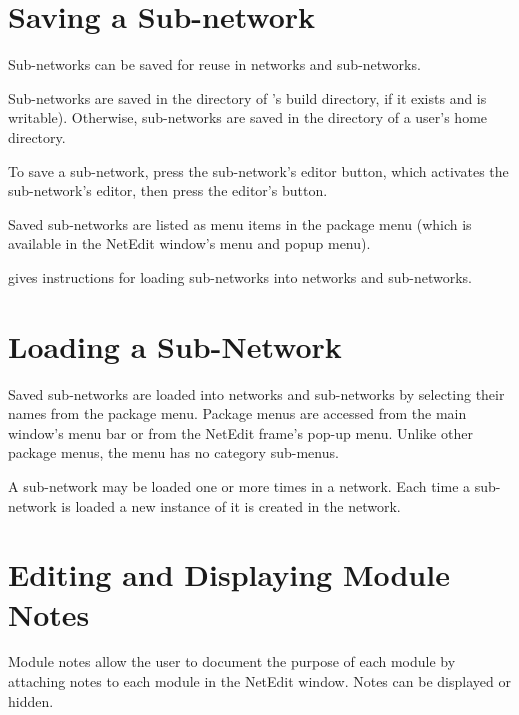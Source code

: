 \section{Saving a Sub-network}
\label{sec:savesubnet}

Sub-networks can be saved for reuse in networks and sub-networks.

Sub-networks are saved in the  directory of \sr{}'s
build directory, if it exists and is writable).  Otherwise, sub-networks
are saved in the  directory of a user's home
directory.

To save a sub-network, press the sub-network's editor
button, which activates the sub-network's editor, then press the
editor's  button.

Saved sub-networks are listed as menu items in the 
package menu (which is available in the NetEdit window's 
menu and popup menu).

 gives instructions for
loading sub-networks into networks and sub-networks.

\section{Loading a Sub-Network}
\label{sec:loadsubnet}

Saved sub-networks are loaded into networks and sub-networks by
selecting their names from the  package menu.
Package menus are accessed from the main window's menu bar or from the
NetEdit frame's pop-up menu.  Unlike other package menus, the
 menu has no category sub-menus.

A sub-network may be loaded one or more times in a network.  Each time
a sub-network is loaded a new instance of it is created in the
network.

\section{Editing and Displaying Module Notes}
\label{sec:modnotes}

Module notes allow the user to document the purpose of each module by
attaching notes to each module in the NetEdit window.  Notes can be
displayed or hidden.

